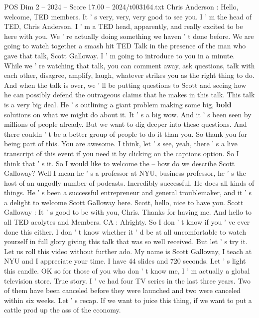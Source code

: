 \begin{textsample}{POS Dim 2 – 2024 – Score 17.00 – 2024/t003164.txt}  \label{ex:f2_pos_034}
Chris Anderson : Hello, welcome, TED members.
It ' s very, very, very good to see you.
I ' m the head of TED, Chris Anderson.
I ' m a TED head, apparently, and really excited to be here with you.
We ' re actually doing something we haven ' t done before.
We are going to watch together a smash hit TED Talk in the presence of the man who gave that talk, Scott Galloway.
I ' m going to introduce to you in a minute.
While we ' re watching that talk, you can comment away, ask questions, talk with each other, disagree, amplify, laugh, whatever strikes you as the right thing to do.
And when the talk is over, we ' ll be putting questions to Scott and seeing how he can possibly defend the outrageous claims that he makes in this talk.
This talk is a very big deal.
He ' s outlining a giant problem making some big, \textbf{bold} solutions on what we might do about it.
It ' s a big wow.
And it ' s been seen by millions of people already.
But we want to dig deeper into these questions.
And there couldn ' t be a better group of people to do it than you.
So thank you for being part of this.
You are awesome.
I think, let ' s see, yeah, there ' s a live transcript of this event if you need it by clicking on the captions option.
So I think that ' s it.
So I would like to welcome the -- how do we describe Scott Galloway?
Well I mean he ' s a professor at NYU, business professor, he ' s the host of an ungodly number of podcasts.
Incredibly successful.
He does all kinds of things.
He ' s been a successful entrepreneur and general troublemaker, and it ' s a delight to welcome Scott Galloway here.
Scott, hello, nice to have you.
Scott Galloway : It ' s good to be with you, Chris.
Thanks for having me.
And hello to all TED acolytes and Members.
CA : Alrighty.
So I don ' t know if you ' ve ever done this either.
I don ' t know whether it ' d be at all uncomfortable to watch yourself in full glory giving this talk that was so well received.
But let ' s try it.
Let us roll this video without further ado.
My name is Scott Galloway, I teach at NYU and I appreciate your time.
I have 44 slides and 720 seconds.
Let ' s light this candle.
OK so for those of you who don ' t know me, I ' m actually a global television store.
True story.
I ' ve had four TV series in the last three years.
Two of them have been canceled before they were launched and two were canceled within six weeks.
Let ' s recap.
If we want to juice this thing, if we want to put a cattle prod up the ass of the economy.

\end{textsample}
